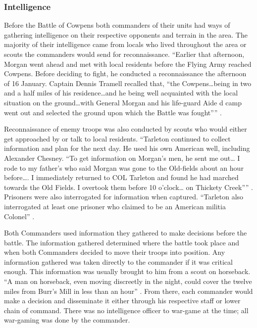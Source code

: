 \subsubsection{Intelligence}

Before the Battle of Cowpens both commanders of their units had ways of
gathering intelligence on their respective opponents and terrain in the area.
The majority of their intelligence came from locals who lived throughout the
area or scouts the commanders would send for reconnaissance.  “Earlier that
afternoon, Morgan went ahead and met with local residents before the Flying Army
reached Cowpens.  Before deciding to fight, he conducted a reconnaissance the
afternoon of 16 January.  Captain Dennis Tramell recalled that, “the
Cowpens…being in two and a half miles of his residence…and he being well
acquainted with the local situation on the ground…with General Morgan and his
life-guard Aide d camp went out and selected the ground upon which the Battle
was fought”” \cite[p. 53]{babits_devil_2001}.  

Reconnaissance of enemy troops was also conducted by scouts who would either get
approached by or talk to local residents.  “Tarleton continued to collect
information and plan for the next day.  He used his own American well, including
Alexander Chesney.  “To get information on Morgan’s men, he sent me out… I rode
to my father’s who said Morgan was gone to the Old-fields about an hour before….
I immediately returned to COL Tarleton and found he had marched towards the Old
Fields.  I overtook them before 10 o’clock… on Thickety Creek””
\cite[p.56]{babits_devil_2001}.
Prisoners were also interrogated for information when captured.  “Tarleton also
interrogated at least one prisoner who claimed to be an American militia
Colonel” \cite[p.56]{babits_devil_2001}.

Both Commanders used information they gathered to make decisions before the
battle.  The information gathered determined where the battle took place and
when both Commanders decided to move their troops into position.  Any
information gathered was taken directly to the commander if it was critical
enough.  This information was usually brought to him from a scout on horseback.
“A man on horseback, even moving discreetly in the night, could cover the twelve
miles from Burr’s Mill in less than an hour” \cite[p.57]{babits_devil_2001}.  From there, each
commander would make a decision and disseminate it either through his respective
staff or lower chain of command.  There was no intelligence officer to war-game
at the time; all war-gaming was done by the commander. 

